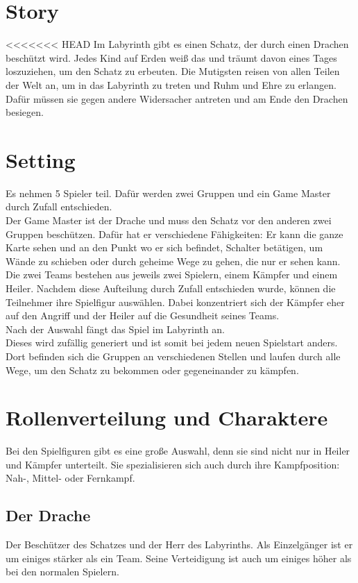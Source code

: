 \documentclass[10pt,a4paper,notitlepage]{report}
\begin{document}
\begin{flushleft}
\section{Story}
<<<<<<< HEAD
Im Labyrinth gibt es einen Schatz, der durch einen Drachen beschützt wird. Jedes Kind auf Erden weiß das und träumt davon eines Tages loszuziehen, um den Schatz zu erbeuten. Die Mutigsten reisen von allen Teilen der Welt an, um in das Labyrinth zu treten und Ruhm und Ehre zu erlangen. Dafür müssen sie gegen andere Widersacher antreten und am Ende den Drachen besiegen.\\
\section{Setting}
Es nehmen 5 Spieler teil. Dafür werden zwei Gruppen und ein Game Master durch Zufall entschieden.\\
Der Game Master ist der Drache und muss den Schatz vor den anderen zwei Gruppen beschützen. Dafür hat er verschiedene Fähigkeiten: Er kann die ganze Karte sehen und an den Punkt wo er sich befindet, Schalter betätigen, um Wände zu schieben oder durch geheime Wege zu gehen, die nur er sehen kann.\\
Die zwei Teams bestehen aus jeweils zwei Spielern, einem Kämpfer und einem Heiler. Nachdem diese Aufteilung durch Zufall entschieden wurde, können die Teilnehmer ihre Spielfigur auswählen. Dabei konzentriert sich der Kämpfer eher auf den Angriff und der Heiler auf die Gesundheit seines Teams.\\
Nach der Auswahl fängt das Spiel im Labyrinth an. \\
Dieses wird zufällig generiert und ist somit bei jedem neuen Spielstart anders. Dort befinden sich die Gruppen an verschiedenen Stellen und laufen durch alle Wege, um den Schatz zu bekommen oder gegeneinander zu kämpfen.\\
\section{Rollenverteilung und Charaktere}
Bei den Spielfiguren gibt es eine große Auswahl, denn sie sind nicht nur in Heiler und Kämpfer unterteilt. Sie spezialisieren sich auch durch ihre Kampfposition: Nah-, Mittel- oder Fernkampf.\\
\subsection{Der Drache} 
Der Beschützer des Schatzes und der Herr des Labyrinths. Als Einzelgänger ist er um einiges stärker als ein Team. Seine Verteidigung ist auch um einiges höher als bei den normalen Spielern.\\

\end{flushleft}
\end{document}
